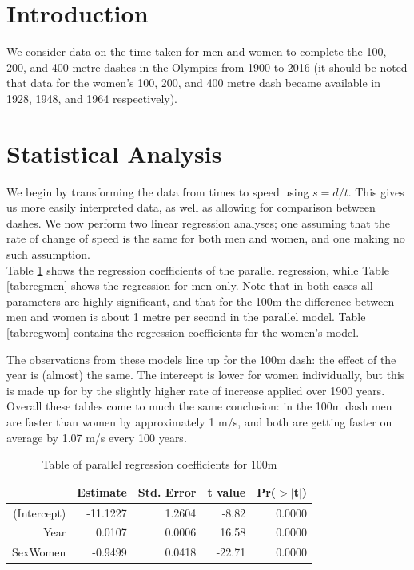 \documentclass[11pt]{article}
\begin{document}
\section{Introduction}
We consider data on the time taken for men and women to complete the 100, 200, and 400 metre dashes in the Olympics from 1900 to 2016 (it should be noted that data for the women's 100, 200, and 400 metre dash became available in 1928, 1948, and 1964 respectively). 

\section{Statistical Analysis}
We begin by transforming the data from times to speed using $s = d/t$. This gives us more easily interpreted data, as well as allowing for comparison between dashes. We now perform two linear regression analyses; one assuming that the rate of change of speed is the same for both men and women, and one making no such assumption. \\

Table \ref{tab:reg1} shows the regression coefficients of the parallel regression, while Table \ref{tab:regmen} shows the regression for men only. Note that in both cases all parameters are highly significant, and that for the 100m the difference between men and women is about 1 metre per second in the parallel model. Table \ref{tab:regwom} contains the regression coefficients for the women's model.

The observations from these models line up for the 100m dash: the effect of the year is (almost) the same. The intercept is lower for women individually, but this is made up for by the slightly higher rate of increase applied over 1900 years. Overall these tables come to much the same conclusion: in the 100m dash men are faster than women by approximately 1 m/s, and both are getting faster on average by 1.07 m/s every 100 years.

\begin{table}[ht]
\centering
\begin{tabular}{rrrrr}
  \hline
 & Estimate & Std. Error & t value & Pr($>$$|$t$|$) \\ 
  \hline
(Intercept) & -11.1227 & 1.2604 & -8.82 & 0.0000 \\ 
  Year & 0.0107 & 0.0006 & 16.58 & 0.0000 \\ 
  SexWomen & -0.9499 & 0.0418 & -22.71 & 0.0000 \\ 
   \hline
\end{tabular}
\caption{Table of parallel regression coefficients for 100m}
\label{tab:reg1}
\end{table}
\end{document}

